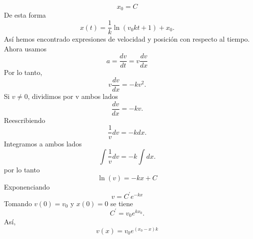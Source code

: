 \documentclass[12pt,a4paper]{article}
\begin{document}
\begin{solucion}
\begin{equation*}
            x_{0}=C
        \end{equation*}
        De esta forma
        \begin{equation*}
            x(t)=\frac{1}{k}\ln(v_{0}kt+1)+x_{0}.
        \end{equation*}
        Así hemos encontrado expresiones de velocidad y posición con respecto al tiempo.
        Ahora usamos
        \begin{equation*}
            a=\frac{dv}{dt}=v\frac{dv}{dx}
        \end{equation*}
        Por lo tanto,
        \begin{equation*}
            v\frac{dv}{dx}=-kv^{2}.
        \end{equation*}
        Si $v\neq0$, dividimos por v ambos lados
        \begin{equation*}
            \frac{dv}{dx}=-kv.
        \end{equation*}
        Reescribiendo
        \begin{equation*}
            \frac{1}{v}dv=-kdx.
        \end{equation*}
        Integramos a ambos lados
        \begin{equation*}
            \int\frac{1}{v}dv=-k\int dx.
        \end{equation*}
        por lo tanto
        \begin{equation*}
            \ln(v)=-kx+C
        \end{equation*}
        Exponenciando
        \begin{equation*}
            v=C^{\prime}e^{-kx}
        \end{equation*}
        Tomando $v(0)=v_{0}$ y $x(0)=0$ se tiene
        \begin{equation*}
            C^{\prime}=v_{0}e^{kx_{0}}.
        \end{equation*}
        Así,
        \begin{equation*}
            v(x)=v_{0}e^{(x_{0}-x)k}
        \end{equation*}
    \end{solucion}
\end{document}
